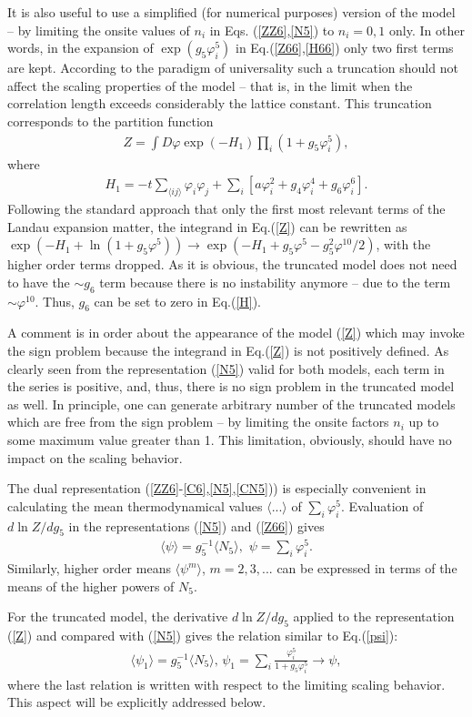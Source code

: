 \documentclass[prb,aps,twocolumn,groupedaddress,floats,showpacs,final]{revtex4}
\def\beq{\begin{eqnarray}}
\def\eeq{\end{eqnarray}}
\begin{document}
It is also useful to use a simplified (for numerical purposes) version of the model -- by limiting the onsite values of $n_i$ in Eqs. (\ref{ZZ6},\ref{N5}) to
$n_i=0,1$ only.  In other words, in the expansion of $\exp(g_5 \varphi^5_i)$ in Eq.(\ref{Z66},\ref{H66}) only  two first terms are kept. According to the paradigm of universality such a truncation should not affect the scaling properties of the model -- that is, in the limit when the correlation length exceeds considerably the lattice constant. This truncation corresponds to the partition function    
\beq
Z=\int D\varphi \exp(-H_1)\prod_i (1+g_5 \varphi^5_i),
\label{Z}
\eeq
where
\beq
H_1= -t \sum_{\langle ij\rangle} \varphi_i \varphi_j  + \sum_i [ a \varphi_i^2 + g_4 \varphi_i^4 +g_6\varphi^6_i] .
\label{H}
\eeq
 Following the standard approach \cite{Landau} that only the first most relevant terms of the Landau expansion matter, the integrand in Eq.(\ref{Z}) can be rewritten as $\exp(-H_1 +\ln(1+g_5\varphi^5)) \to \exp(-H_1 +g_5\varphi^5 -  g_5^2\varphi^{10}/2 )$, with the higher order terms dropped. As it is obvious, the truncated model does not need to have the $\sim g_6$ term because there is no instability anymore -- due to the term $\sim \varphi^{10}$.     
Thus, $g_6$ can be set to zero in Eq.(\ref{H}). 

A comment is in order about the appearance of the model (\ref{Z}) which may invoke the sign problem  because the integrand in Eq.(\ref{Z}) is not positively defined. As clearly seen from the representation (\ref{N5}) valid for both models, each term in the series is positive, and, thus, there is no sign problem in the truncated model as well. In principle, one can generate arbitrary number of the truncated models which are free from the sign problem --
by limiting the onsite factors $n_i$ up to some maximum value greater than 1. This limitation, obviously, should have no impact on the scaling behavior.

The dual representation (\ref{ZZ6}-\ref{C6},\ref{N5},\ref{CN5})) is especially convenient in calculating the mean thermodynamical values $\langle ...\rangle$ of  $\sum_i \varphi^5_i$. 
 Evaluation of $ d \ln Z/dg_5$ in the representations 
(\ref{N5}) and (\ref{Z66}) gives 
\beq
\langle \psi \rangle = g_5^{-1} \langle N_5\rangle, \,\, \psi= \sum_i \varphi^5_i .
\label{psi}
\eeq
Similarly, higher order means $\langle \psi^m \rangle$, $m=2,3, ...$  can be expressed in terms of the means  of the higher powers of $N_5$.

 For the truncated model, the derivative $ d \ln Z/dg_5$ applied to the representation (\ref{Z}) and compared with (\ref{N5}) gives the relation similar to Eq.(\ref{psi}):
\beq
\langle \psi_1 \rangle = g_5^{-1} \langle N_5\rangle, \, \psi_1= \sum_i \frac{\varphi^5_i}{1+g_5 \varphi^5_i} \to \psi,
\label{psi1}
\eeq
where the last relation is written with respect to the limiting scaling behavior. This aspect will be explicitly addressed below.
\end{document}
